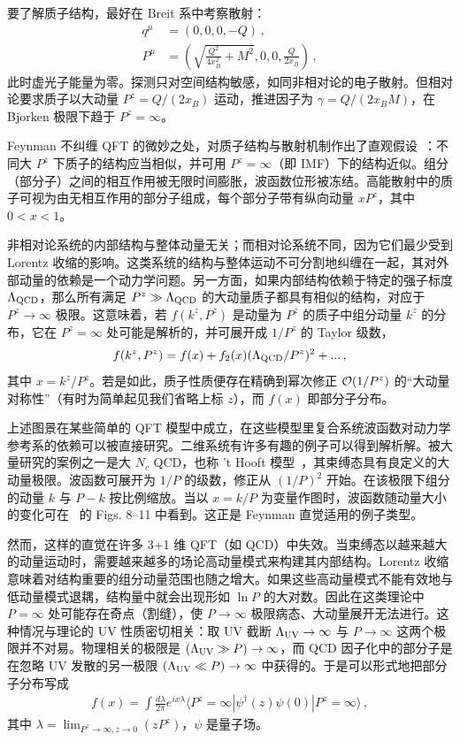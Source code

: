 要了解质子结构，最好在 Breit 系中考察散射：
\begin{align}\label{eq:diskin}
	q^\mu &= (0,0,0,-Q)  \,, \nonumber \\
	P^\mu &=\left(\sqrt{\frac{Q^2}{4x_B^2}+M^2}, 0, 0, \frac{Q}{2x_B}\right) \,,
\end{align}
此时虚光子能量为零。探测只对空间结构敏感，如同非相对论的电子散射。但相对论要求质子以大动量 $P^z= Q/(2x_B)$ 运动，推进因子为 $\gamma = Q/(2x_BM)$，在 Bjorken 极限下趋于 $P^z=\infty$。

Feynman 不纠缠 QFT 的微妙之处，对质子结构与散射机制作出了直观假设~\cite{Feynman:1973xc}：不同大 $P^z$ 下质子的结构应当相似，并可用 $P^z=\infty$（即 IMF）下的结构近似。组分（部分子）之间的相互作用被无限时间膨胀，波函数位形被冻结。高能散射中的质子可视为由无相互作用的部分子组成，每个部分子带有纵向动量 $xP^z$，其中 $0< x< 1$。

非相对论系统的内部结构与整体动量无关；而相对论系统不同，因为它们最少受到 Lorentz 收缩的影响。这类系统的结构与整体运动不可分割地纠缠在一起，其对外部动量的依赖是一个动力学问题。另一方面，如果内部结构依赖于特定的强子标度 $\Lambda_{\rm QCD}$，那么所有满足 $P^z\gg \Lambda_{\rm QCD}$ 的大动量质子都具有相似的结构，对应于 $P^z\to \infty$ 极限。这意味着，若 $f(k^z,P^z)$ 是动量为 $P^z$ 的质子中组分动量 $k^z$ 的分布，它在 $P^z=\infty$ 处可能是解析的，并可展开成 $1/P^z$ 的 Taylor 级数，
\begin{align}\label{Eq:expansion}
	f(k^z, P^z) = f(x) + f_2(x)(\Lambda_{\rm QCD}/P^z)^2 + ...\,,
\end{align}
其中 $x=k^z/P^z$。若是如此，质子性质便存在精确到幂次修正 ${\cal O}(1/P^z)$ 的``大动量对称性''（有时为简单起见我们省略上标 $z$），而 $f(x)$ 即部分子分布。

上述图景在某些简单的 QFT 模型中成立，在这些模型里复合系统波函数对动力学参考系的依赖可以被直接研究。二维系统有许多有趣的例子可以得到解析解。被大量研究的案例之一是大 $N_c$ QCD，也称 't Hooft 模型~\cite{tHooft:1974pnl}，其束缚态具有良定义的大动量极限。波函数可展开为 $1/P$ 的级数，修正从 $(1/P)^2$ 开始。在该极限下组分的动量 $k$ 与 $P-k$ 按比例缩放。当以 $x=k/P$ 为变量作图时，波函数随动量大小的变化可在~\cite{Jia:2017uul} 的 Figs. 8--11 中看到。这正是 Feynman 直觉适用的例子类型。

然而，这样的直觉在许多 3+1 维 QFT（如 QCD）中失效。当束缚态以越来越大的动量运动时，需要越来越多的场论高动量模式来构建其内部结构。Lorentz 收缩意味着对结构重要的组分动量范围也随之增大。如果这些高动量模式不能有效地与低动量模式退耦，结构量中就会出现形如 $\ln P$ 的大对数。因此在这类理论中 $P=\infty$ 处可能存在奇点（割缝），使 $P\to \infty$ 极限病态、大动量展开无法进行。这种情况与理论的 UV 性质密切相关：取 UV 截断 $\Lambda_{\rm UV}\to \infty$ 与 $P\to \infty$ 这两个极限并不对易。物理相关的极限是 $(\Lambda_{\rm UV}\gg P)\to \infty$，而 QCD 因子化中的部分子是在忽略 UV 发散的另一极限 $(\Lambda_{\rm UV}\ll P)\to \infty$ 中获得的。于是可以形式地把部分子分布写成
\begin{align}\label{eq:pd}
	f(x) = \int \frac{d\lambda}{2\pi} e^{ix\lambda}\langle P^z=\infty|\psi^\dagger(z) \psi(0)|P^z=\infty\rangle\,,
\end{align}
其中 $\lambda = \lim_{P^z\to\infty, z\to 0} (zP^z)$，$\psi$ 是量子场。

